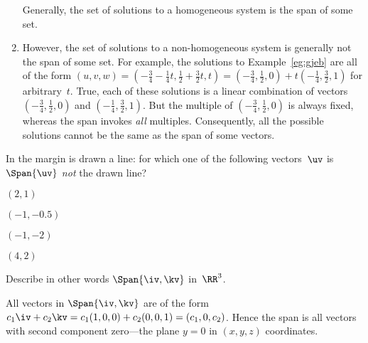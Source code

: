 \begin{example}
\begin{enumerate}
Generally, the set of solutions to a homogeneous system is the span of some set.

\item However, the set of solutions to a non-homogeneous system is generally not the span of some set.  
For example, the solutions to Example~\ref{eg:gjeb} are all of the form \((u,v,w)=(-\frac34-\frac14t,\frac12+\frac32t,t) 
=(-\frac34,\frac12,0)+t(-\frac14,\frac32,1)\) for arbitrary~\(t\).
True, each of these solutions is a linear combination of vectors \((-\frac34,\frac12,0)\) and \((-\frac14,\frac32,1)\). 
But the multiple of \((-\frac34,\frac12,0)\) is always fixed, whereas the span invokes \emph{all} multiples.
Consequently, all the possible solutions cannot be the same as the span of some vectors.


\end{enumerate}
\end{example}



\begin{activity}
In the margin is drawn a line: 
%
for which one of the following vectors~\(\uv\) is \(\Span\{\uv\}\) \emph{not} the drawn line?
\begin{parts}
\item \((2,1)\)
\item \((-1,-0.5)\)
\item \((-1,-2)\)
\item \((4,2)\)
\end{parts}
\end{activity}



\begin{example} \label{eg:}
Describe in other words \(\Span\{\iv,\kv\}\) in~\(\RR^3\).

\begin{solution} 
All vectors in \(\Span\{\iv,\kv\}\) are of the form
\(c_1\iv+c_2\kv
=c_1(1,0,0)+c_2(0,0,1)
=(c_1,0,c_2)\).
Hence the span is all vectors with second component zero---the plane \(y=0\) in \((x,y,z)\) coordinates.
\end{solution}
\end{example}




